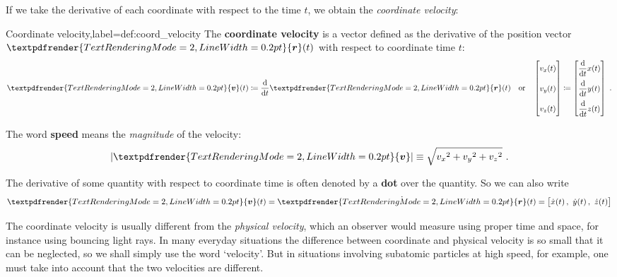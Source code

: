 \documentclass[a4paper,12pt,%
onecolumn,oneside,%
british%
]{memoir}
\renewcommand*{\bm}[1]{\textpdfrender{TextRenderingMode=2,LineWidth=0.2pt}{\boldsymbol{#1}}}
\newcommand*{\di}{\mathrm{d}}%
\newcommand*{\defd}{\coloneqq}
\DeclarePairedDelimiter\abs{\lvert}{\rvert}
\renewcommand*{\|}[1][]{\nonscript\:#1\vert\nonscript\:\mathopen{}}
\newcommand*{\yr}{\bm{r}}
\newcommand*{\yv}{\bm{v}}
\begin{document}
If we take the derivative of each coordinate with respect to the time $t$, we obtain the \emph{coordinate velocity}:

\begin{definition}{Coordinate velocity,label={def:coord_velocity}}
  The \textbf{coordinate velocity} is a vector defined as the derivative of the position vector $\yr(t)$ with respect to coordinate time $t$:
  \begin{equation*}
    \yv(t) %
    \defd \frac{\di}{\di t}\yr(t)
    \quad\text{or}\quad
    \begin{bmatrix}
      v_{x}(t)\vphantom{\dfrac{\di}{\di t}}\\[3\jot]
      v_{y}(t)\vphantom{\dfrac{\di}{\di t}}\\[3\jot]
      v_{z}(t)\vphantom{\dfrac{\di}{\di t}}
    \end{bmatrix}
    \defd
    \begin{bmatrix}
      \dfrac{\di}{\di t} x(t)\\[3\jot]
      \dfrac{\di}{\di t} y(t)\\[3\jot]
      \dfrac{\di}{\di t} z(t)
    \end{bmatrix} \ .
  \end{equation*}

  \smallskip

  The word \textbf{speed} means the \emph{magnitude} of the velocity:
  \begin{equation*}
    \abs{\yv} \equiv \sqrt{{v_{x}}^{2} + {v_{y}}^{2} + {v_{z}}^{2}} \ .
  \end{equation*}

  \smallskip

    The derivative of some quantity with respect to coordinate time is often denoted by a \textbf{dot} over the quantity. So we can also write
    \begin{equation*}
      \yv(t) = \dot{\yr}(t) = \bigl[\dot{x}(t)\,,\ \dot{y}(t)\,,\ \dot{z}(t)\bigr]
    \end{equation*}
  \end{definition}
The coordinate velocity is usually different from the \emph{physical velocity}, which an observer would measure using proper time and space, for instance using bouncing light rays. In many everyday situations the difference between coordinate and physical velocity is so small that it can be neglected, so we shall simply use the word \enquote*{velocity}. But in situations involving subatomic particles at high speed, for example, one must take into account that the two velocities are different.
\end{document}
